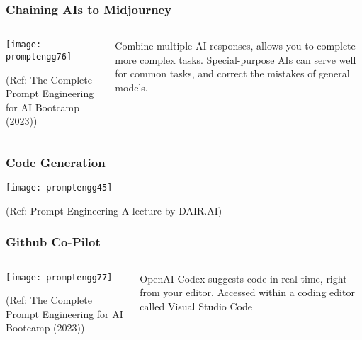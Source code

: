 \begin{frame}[fragile]\frametitle{Chaining AIs to Midjourney}


\begin{columns}
    \begin{column}[T]{0.6\linewidth}
		\begin{center}
		\texttt{[image: promptengg76]}

		{\tiny (Ref: The Complete Prompt Engineering for AI Bootcamp (2023))}
		\end{center}	
    \end{column}
    \begin{column}[T]{0.4\linewidth}
		Combine multiple AI responses, allows you to complete more complex tasks.
		Special-purpose AIs can serve well for common tasks, and correct the mistakes of general models.
    \end{column}
  \end{columns}
\end{frame}

\begin{frame}[fragile]\frametitle{Code Generation}

\begin{center}
\texttt{[image: promptengg45]}

{\tiny (Ref: Prompt Engineering A lecture by DAIR.AI)}

\end{center}
\end{frame}

\begin{frame}[fragile]\frametitle{Github Co-Pilot}

\begin{columns}
    \begin{column}[T]{0.6\linewidth}
		\begin{center}
		\texttt{[image: promptengg77]}

		{\tiny (Ref: The Complete Prompt Engineering for AI Bootcamp (2023))}
		\end{center}	
    \end{column}
    \begin{column}[T]{0.4\linewidth}
		OpenAI Codex suggests code in real-time, right from your editor. Accessed within a coding
editor called Visual Studio Code
    \end{column}
  \end{columns}
\end{frame}

